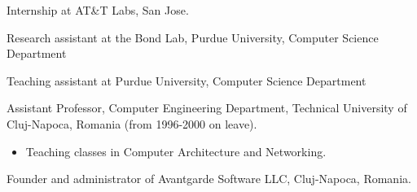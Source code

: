  Internship at AT\&T Labs, San Jose.


 Research assistant at the Bond Lab, Purdue University, Computer
Science Department


 Teaching assistant at Purdue University, Computer Science
Department

 Assistant Professor, Computer Engineering Department, Technical University of Cluj-Napoca, Romania (from 1996-2000 on leave).
\begin{itemize}
\item Teaching classes in Computer Architecture and Networking.
\end{itemize}

 Founder and administrator of Avantgarde Software LLC,
Cluj-Napoca, Romania.

